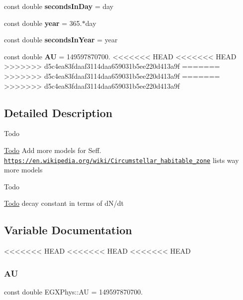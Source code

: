 \begin{DoxyCompactItemize}
const double {\bfseries seconds\+In\+Day} = day
\item 
\mbox{\label{namespace_e_g_x_phys_afee9eebc1da4a1db2198fe0c45bcb53f}} 
const double {\bfseries year} = 365.$\ast$day
\item 
\mbox{\label{namespace_e_g_x_phys_aac13efe8296819409bde4a0a8691d56a}} 
const double {\bfseries seconds\+In\+Year} = year
\item 
\mbox{\label{namespace_e_g_x_phys_a999332303a2214425184fbe23dbae0c5}} 
const double {\bfseries AU} = 149597870700.
<<<<<<< HEAD
<<<<<<< HEAD
>>>>>>> d5c4ea83fdaaf3114daa659031b5ee220d413a9f
=======
>>>>>>> d5c4ea83fdaaf3114daa659031b5ee220d413a9f
=======
>>>>>>> d5c4ea83fdaaf3114daa659031b5ee220d413a9f
\end{DoxyCompactItemize}


\subsection{Detailed Description}
\begin{DoxyRefDesc}{Todo}
\item[\hyperlink{todo__todo000001}{Todo}]Add more models for Seff. \href{https://en.wikipedia.org/wiki/Circumstellar_habitable_zone}{\tt https\+://en.\+wikipedia.\+org/wiki/\+Circumstellar\+\_\+habitable\+\_\+zone} lists way more models \end{DoxyRefDesc}


\begin{DoxyRefDesc}{Todo}
\item[\hyperlink{todo__todo000002}{Todo}]decay constant in terms of d\+N/dt \end{DoxyRefDesc}


\subsection{Variable Documentation}
<<<<<<< HEAD
<<<<<<< HEAD
<<<<<<< HEAD
\mbox{\label{namespace_e_g_x_phys_a999332303a2214425184fbe23dbae0c5}} 
\subsubsection{\texorpdfstring{AU}{AU}}
{\footnotesize\ttfamily const double E\+G\+X\+Phys\+::\+AU = 149597870700.}

